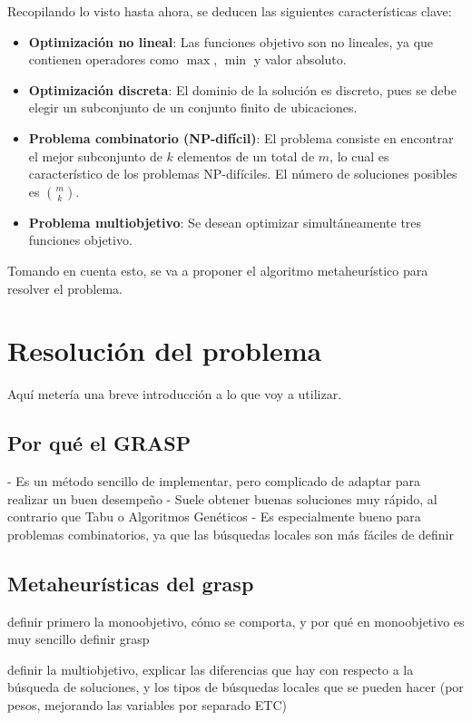 \documentclass[12pt,a4paper]{book}
\begin{document}
Recopilando lo visto hasta ahora, se deducen las siguientes características clave:

\begin{itemize}
    \item \textbf{Optimización no lineal}: Las funciones objetivo son no lineales, ya que contienen operadores como $\max$, $\min$ y valor absoluto.
    
    \item \textbf{Optimización discreta}: El dominio de la solución es discreto, pues se debe elegir un subconjunto de un conjunto finito de ubicaciones.
    
    \item \textbf{Problema combinatorio (NP-difícil)}: El problema consiste en encontrar el mejor subconjunto de $k$ elementos de un total de $m$, lo cual es característico de los problemas NP-difíciles. El número de soluciones posibles es $\binom{m}{k}$.
    
    \item \textbf{Problema multiobjetivo}: Se desean optimizar simultáneamente tres funciones objetivo.
\end{itemize}

Tomando en cuenta esto, se va a proponer el algoritmo metaheurístico para resolver el problema.


\chapter{Resolución del problema}
Aquí metería una breve introducción a lo que voy a utilizar.

\section{Por qué el GRASP}
- Es un método sencillo de implementar, pero complicado de adaptar para realizar un buen desempeño
- Suele obtener buenas soluciones muy rápido, al contrario que Tabu o Algoritmos Genéticos
- Es especialmente bueno para problemas combinatorios, ya que las búsquedas locales son más fáciles de definir

\section{Metaheurísticas del grasp}
definir primero la monoobjetivo, cómo se comporta, y por qué en monoobjetivo es muy sencillo definir grasp

definir la multiobjetivo, explicar las diferencias que hay con respecto a la búsqueda de soluciones, y los tipos de búsquedas locales que se pueden hacer (por pesos, mejorando las variables por separado ETC)
\end{document}
